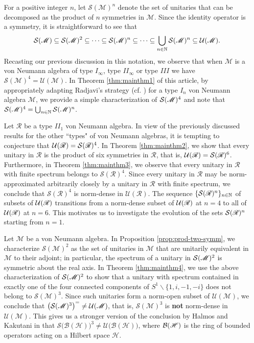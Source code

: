\documentclass[12pt, preprint]{amsart}
\newcommand{\N}{\mathbb{N}}
\theoremstyle{definition}
\theoremstyle{remark}
\numberwithin{equation}{section}
\theoremstyle{ser}
\theoremstyle{serr}
\theoremstyle{ser}
\begin{document}
 For a positive integer $n$, let $\mathcal{S}(\mathscr{M})^n$ denote the set of unitaries that can be decomposed as the product of $n$ symmetries in $\mathscr{M}$. Since the identity operator is a symmetry, it is straightforward to see that $$\mathcal{S}(\mathscr{M}) \subseteq \mathcal{S}(\mathscr{M})^2 \subseteq \cdots \subseteq \mathcal{S}(\mathscr{M})^n \subseteq \cdots \subseteq \bigcup_{n \in \N} \sS (\mathscr{M})^n \subseteq \mathcal{U}(\mathscr{M}).$$
Recasting our previous discussion in this notation, we observe that when $\mathscr{M}$ is a von Neumann algebra of type $I_{\infty}$, type $II_{\infty}$ or type $III$ we have $\mathcal{S}(\mathscr{M})^4 = \mathcal{U}(\mathscr{M})$. In Theorem \ref{thm:mainthm1} of this article, by appropriately adapting Radjavi's strategy (cf. \cite{radjavi}) for a type $I_n$ von Neumann algebra $\mathscr{M}$, we provide a simple characterization of $\mathcal S (\mathscr{M})^4$ and note that $\sS (\mathscr{M})^4 = \bigcup_{n \in \N} \sS (\mathscr{M})^n$.

Let $\mathscr{R}$ be a type $II_1$ von Neumann algebra. In view of the previously discussed results for the other ``types" of von Neumann algebras, it is tempting to conjecture that $\mathcal U (\mathscr{R}) = \mathcal S (\mathscr{R})^4$. In Theorem \ref{thm:mainthm2}, we show that every unitary in $\mathscr{R}$ is the product of six symmetries in $\mathscr{R}$, that is, $\mathcal{U}(\mathscr{R}) = \mathcal S (\mathscr{R})^6$. Furthermore, in Theorem \ref{thm:mainthm3}, we observe that every unitary in $\mathscr{R}$ with finite spectrum belongs to $\mathcal{S}(\mathscr{R})^4$. Since every unitary in $\mathscr{R}$ may be norm-approximated arbitrarily closely by a unitary in $\mathscr{R}$ with finite spectrum, we conclude that $\mathcal{S}(\mathscr{R})^4$ is norm-dense in $\mathcal{U}(\mathscr{R})$. The sequence $\{ \sS (\mathscr{R})^n \}_{n \in \N}$ of subsets of $\mathcal U (\mathscr{R})$ transitions from a norm-dense subset of $\mathcal U (\mathscr{R})$ at $n=4$ to all of $\mathcal U (\mathscr{R})$ at $n=6$. This motivates us to investigate the evolution of the sets $\mathcal S (\mathscr{R})^n$ starting from $n=1$.

Let $\mathscr{M}$ be a von Neumann algebra. In Proposition \ref{prop:prod-two-symm}, we characterize $\mathcal{S}(\mathscr{M})^2$ as the set of unitaries in $\mathscr{M}$ that are unitarily equivalent in $\mathscr{M}$ to their adjoint; in particular, the spectrum of a unitary in $\mathcal S (\mathscr{M})^2$ is symmetric about the real axis. In Theorem \ref{thm:mainthm4}, we use the above characterization of $\mathcal S (\mathscr{M})^2$ to show that a unitary with spectrum contained in exactly one of the four connected components of $S^1 \backslash \{ 1, i, -1, -i \}$ does not belong to $\mathcal{S}(\mathscr{M})^3$. Since such unitaries form a norm-open subset of $\mathcal{U}(\mathscr{M})$, we conclude that $\big( \mathcal{S}(\mathscr{M})^3 \big)^{=} \ne \mathcal U (\mathscr{M})$, that is,  $\mathcal{S}(\mathscr{M})^3$ is {\bf not} norm-dense in $\mathcal{U}(\mathscr{M})$. This gives us a stronger version of the conclusion by Halmos and Kakutani in \cite{halmos-kakutani} that $\mathcal{S} \big( \mathcal{B}(\mathscr{H}) \big)^3 \ne \mathcal{U} \big( \mathcal{B}(\mathscr{H}) \big)$, where $\mathcal B (\mathscr{H})$ is the ring of bounded operators acting on a Hilbert space $\mathscr{H}$.
\end{document}
